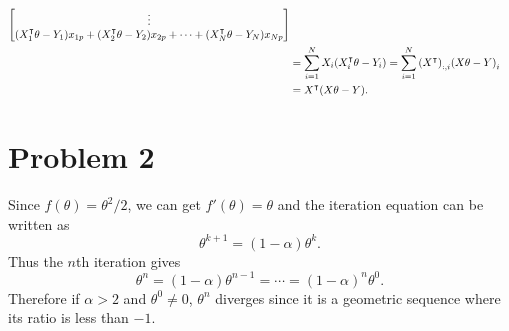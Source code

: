 \documentclass[10pt]{article}
\begin{document}
\begin{enumerate}[leftmargin=*, label={(\alph*)}]
\begin{align*}
\begin{bmatrix}
            \vdots \\
            \qty(X_1^\intercal \theta - Y_1)x_{1p} + \qty(X_2^\intercal \theta - Y_2)x_{2p} + \cdots + \qty(X_N^\intercal \theta - Y_N)x_{Np} \\
        \end{bmatrix} \\
        &= \sum_{i=1}^{N}X_i\qty(X_i^\intercal \theta - Y_i) = \sum_{i=1}^{N}\qty(X^\intercal )_{:,i}\qty(X\theta-Y)_i \\
        &= X^\intercal \qty(X\theta-Y).
    \end{align*}
\end{enumerate}

\section*{Problem 2}
Since $f(\theta) = \theta^2 / 2$, we can get $f'(\theta) = \theta$ and the iteration equation can be written as 
$$\theta^{k+1} = (1-\alpha)\theta^k.$$
Thus the $n$th iteration gives
$$\theta^n = (1-\alpha)\theta^{n-1} = \cdots = (1-\alpha)^n\theta^0.$$
Therefore if $\alpha>2$ and $\theta^0 \neq 0$, $\theta^n$ diverges since it is a geometric sequence where its ratio is less than $-1$.
\end{document}

